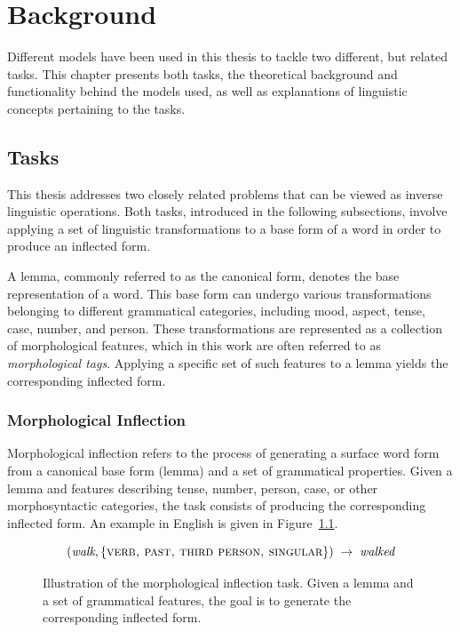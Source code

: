 \chapter{Background}\label{chapter:background}

Different models have been used in this thesis to tackle two different, but related tasks. This chapter presents both tasks, the theoretical background and functionality behind the models used, as well as explanations of linguistic concepts pertaining to the tasks.

\section{Tasks}

This thesis addresses two closely related problems that can be viewed as inverse linguistic operations. Both tasks, introduced in the following subsections, involve applying a set of linguistic transformations to a base form of a word in order to produce an inflected form.

A lemma, commonly referred to as the canonical form, denotes the base representation of a word. This base form can undergo various transformations belonging to different grammatical categories, including mood, aspect, tense, case, number, and person. These transformations are represented as a collection of morphological features, which in this work are often referred to as \emph{morphological tags}. Applying a specific set of such features to a lemma yields the corresponding inflected form.

\subsection{Morphological Inflection}

Morphological inflection refers to the process of generating a surface word form from a canonical base form (lemma) and a set of grammatical properties. Given a lemma and features describing tense, number, person, case, or other morphosyntactic categories, the task consists of producing the corresponding inflected form. An example in English is given in Figure~\ref{fig:inflection_example}.

\begin{figure}[h]
\centering
\[
(\textit{walk}, \{\textsc{verb, past, third person, singular}\}) \;\rightarrow\; \textit{walked}
\]
\caption{Illustration of the morphological inflection task. Given a lemma and a set of grammatical features, the goal is to generate the corresponding inflected form.}
\label{fig:inflection_example}
\end{figure}

